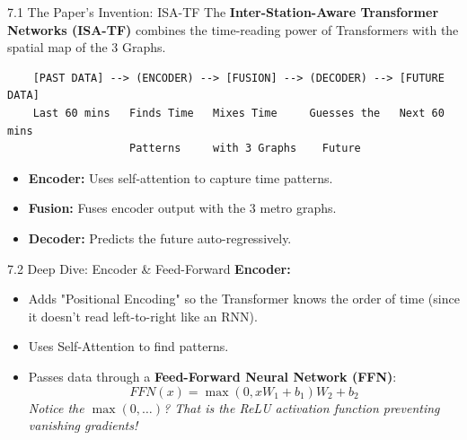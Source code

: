 \documentclass[aspectratio=169]{beamer}
\begin{document}
\begin{frame}[fragile]{7.1 The Paper's Invention: ISA-TF}
    The \textbf{Inter-Station-Aware Transformer Networks (ISA-TF)} combines the time-reading power of Transformers with the spatial map of the 3 Graphs.
    
    \begin{verbatim}
    [PAST DATA] --> (ENCODER) --> [FUSION] --> (DECODER) --> [FUTURE DATA]
    Last 60 mins   Finds Time   Mixes Time     Guesses the   Next 60 mins
                   Patterns     with 3 Graphs    Future
    \end{verbatim}

    \begin{itemize}
        \item \textbf{Encoder:} Uses self-attention to capture time patterns.
        \item \textbf{Fusion:} Fuses encoder output with the 3 metro graphs.
        \item \textbf{Decoder:} Predicts the future auto-regressively.
    \end{itemize}
\end{frame}

\begin{frame}{7.2 Deep Dive: Encoder \& Feed-Forward}
    \textbf{Encoder:}
    \begin{itemize}
        \item Adds "Positional Encoding" so the Transformer knows the order of time (since it doesn't read left-to-right like an RNN).
        \item Uses Self-Attention to find patterns.
        \item Passes data through a \textbf{Feed-Forward Neural Network (FFN)}:
        \[
        FFN(x) = \max(0, xW_1 + b_1)W_2 + b_2
        \]
        \textit{Notice the $\max(0, \dots)$? That is the ReLU activation function preventing vanishing gradients!}
    \end{itemize}
\end{frame}
\end{document}
